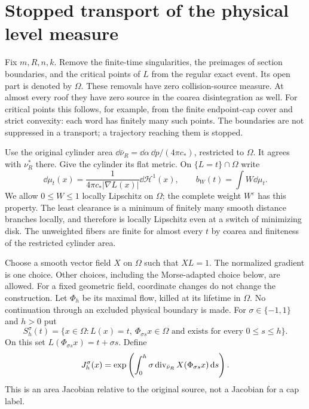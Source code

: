\section{Stopped transport of the physical level measure}
\label{sec:v76-transport}
Fix $m,R,n,k$. Remove the finite-time singularities, the preimages
of section boundaries, and the critical points of $L$ from the
regular exact event. Its open part is denoted by $\Omega$. These
removals have zero collision-source measure. At almost every roof
they have zero source in the coarea disintegration as well. For
critical points this follows, for example, from the finite
endpoint-cap cover and strict convexity: each word has finitely
many such points. The boundaries are not suppressed in a transport;
a trajectory reaching them is stopped.

Use the original cylinder area
$\dd\bar\nu_R=\dd\alpha\,\dd p/(4\pi c_*)$, restricted to
$\Omega$. It agrees with $\nu_R^*$ there. Give the cylinder its
flat metric. On $\{L=t\}\cap\Omega$ write
\begin{equation}\label{eq:v76-coarea-fiber}
 \dd\mu_t(x)=\frac{1}{4\pi c_*|\nabla L(x)|}\dd\mathcal H^1(x),
 \qquad b_W(t)=\int W\dd\mu_t .
\end{equation}
We allow $0\le W\le1$ locally Lipschitz on $\Omega$; the complete
weight $W^\varepsilon$ has this property. The least clearance is a
minimum of finitely many smooth distance branches locally, and
therefore is locally Lipschitz even at a switch of minimizing disk.
The unweighted fibers are finite for almost every $t$ by coarea and
finiteness of the restricted cylinder area.

Choose a smooth vector field $X$ on $\Omega$ such that $XL=1$.
The normalized gradient is one choice. Other choices, including the
Morse-adapted choice below, are allowed. For a fixed geometric field,
coordinate changes do not change the construction. Let $\Phi_h$ be
its maximal flow, killed at its lifetime in $\Omega$. No continuation
through an excluded physical boundary is made. For $\sigma\in\{-1,1\}$
and $h>0$ put
\[
 S^\sigma_h(t)=\{x\in\Omega:L(x)=t,\ \Phi_{\sigma s}x\in\Omega
                    \text{ and exists for every }0\le s\le h\}.
\]
On this set $L(\Phi_{\sigma s}x)=t+\sigma s$. Define
\begin{equation}\label{eq:v76-jacobian}
 J^\sigma_h(x)=\exp\left(\int_0^h
       \sigma\diver_{\bar\nu_R}X(\Phi_{\sigma s}x)\dd s\right).
\end{equation}
This is an area Jacobian relative to the original source, not a
Jacobian for a cap label.

